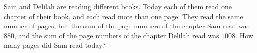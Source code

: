 Sam and Delilah are reading different books. Today each of them read one chapter of their book, and each read more than one page. They read the same number of pages, but the sum of the page numbers of the chapter Sam read was $880$, and the sum of the page numbers of the chapter Delilah read was $1008$. How many pages did Sam read today?
